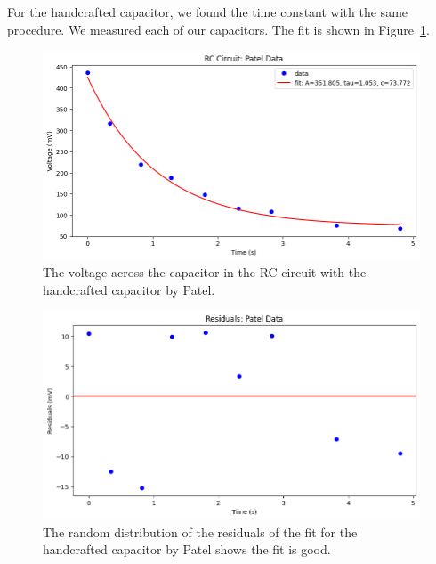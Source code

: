 \documentclass[11pt]{article}
\begin{document}
    For the handcrafted capacitor, we found the time constant with the same procedure.
    We measured each of our capacitors.
    The fit is shown in Figure~\ref{fig:part1b_graph_patel}.

    \begin{figure}[H]
        \includegraphics[width=1.0\linewidth]{resources/images/rc part 1 graph patel}
        \caption{The voltage across the capacitor in the RC circuit with the handcrafted capacitor by Patel.}
        \label{fig:part1b_graph_patel}
    \end{figure}

    \begin{figure}[H]
        \includegraphics[width=1.0\linewidth]{resources/images/rc part 1b patel residuals}
        \caption{The random distribution of the residuals of the fit for the handcrafted capacitor by Patel shows the fit is good.}
        \label{fig:part1b_residuals_patel}
    \end{figure}
\end{document}
